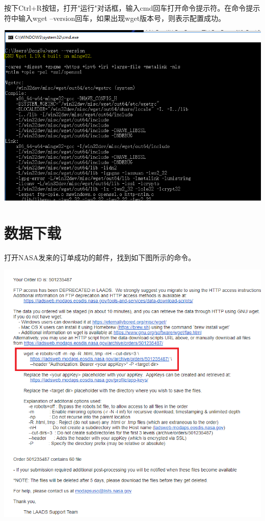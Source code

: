 \documentclass{article}
\begin{document}
	按下Ctrl+R按钮，打开"运行"对话框，输入cmd回车打开命令提示符。在命令提示符中输入wget --version回车，如果出现wget版本号，则表示配置成功。
	
	\includegraphics[width=\linewidth]{sec3_3.png}
	
	
	\section{数据下载}
	
	打开NASA发来的订单成功的邮件，找到如下图所示的命令。
	
	
	\includegraphics[width=\linewidth]{sec4_1.png}
	
\end{document}
